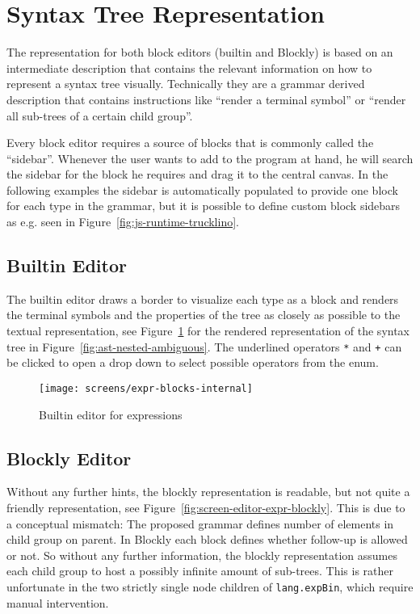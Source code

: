 \documentclass[sigconf,natbib=false]{acmart}
\begin{document}
\section{Syntax Tree Representation}

The representation for both block editors (builtin and Blockly) is based on an intermediate description that contains the relevant information on how to represent a syntax tree visually. Technically they are a grammar derived description that contains instructions like \enquote{render a terminal symbol} or \enquote{render all sub-trees of a certain child group}.

Every block editor requires a source of blocks that is commonly called the \enquote{sidebar}. Whenever the user wants to add to the program at hand, he will search the sidebar for the block he requires and drag it to the central canvas. In the following examples the sidebar is automatically populated to provide one block for each type in the grammar, but it is possible to define custom block sidebars as e.g. seen in Figure~\ref{fig:js-runtime-trucklino}.

\subsection{Builtin Editor}

The builtin editor draws a border to visualize each type as a block and renders the terminal symbols and the properties of the tree as closely as possible to the textual representation, see Figure~\ref{fig:screen-editor-expr-internal} for the rendered representation of the syntax tree in Figure~\ref{fig:ast-nested-ambiguous}. The underlined operators \texttt{*} and \texttt{+} can be clicked to open a drop down to select possible operators from the enum.

\begin{figure}[H]
  \texttt{[image: screens/expr-blocks-internal]}
  \caption{Builtin editor for expressions}
  \label{fig:screen-editor-expr-internal}
\end{figure}

\subsection{Blockly Editor}

Without any further hints, the blockly representation is readable, but not quite a friendly representation, see Figure~\ref{fig:screen-editor-expr-blockly}. This is due to a conceptual mismatch: The proposed grammar defines number of elements in child group on parent. In Blockly each block defines whether follow-up is allowed or not. So without any further information, the blockly representation assumes each child group to host a possibly infinite amount of sub-trees. This is rather unfortunate in the two strictly single node children of \texttt{lang.expBin}, which require manual intervention.
\end{document}
